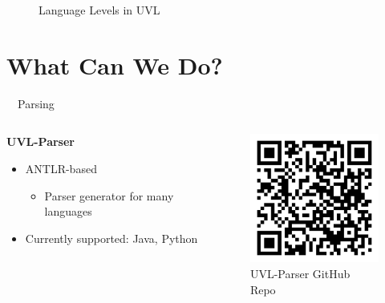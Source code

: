 \documentclass[
	aspectratio=169, %
	8pt, %
	nosectionframes, %
]{beamer}
\newcommand{\inlinesubtitle}[1]{\textcolor{gray!60}{~{}~#1}}
\begin{document}
\begin{frame}[plain]
\begin{figure}
{
		}
		\caption{Language Levels in UVL}
		\label{figure:languagelevels}
	\end{figure}

\end{frame}

\section{What Can We Do?}

\begin{frame}{\insertsection \inlinesubtitle{Parsing}}
\vspace{0.4cm}
    \begin{columns}[t]
		\begin{column}{0.49\textwidth}
			\textbf{UVL-Parser}
            \begin{itemize}
                \item ANTLR-based
                \begin{itemize}
                    \item Parser generator for many languages
                \end{itemize}
                \item Currently supported: Java, Python
            \end{itemize}
		\end{column}%
		\begin{column}{0.49\textwidth}
           \begin{figure}
                \centering
                \includegraphics[width=5cm]{pics/qr/uvl-parser.pdf}
                \caption{UVL-Parser GitHub Repo}
            \end{figure}
		\end{column}
	\end{columns}
\end{frame}
\end{document}
